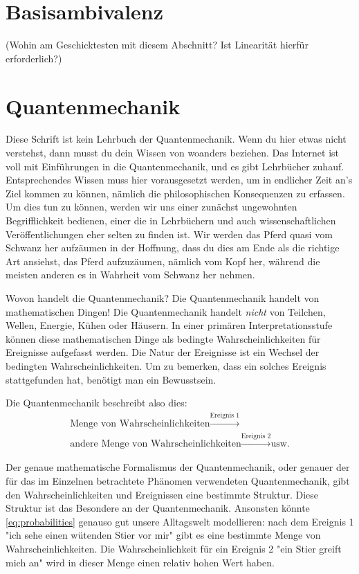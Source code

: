 \documentclass[12pt]{book}
\begin{document}
\section{Basisambivalenz}

(Wohin am Geschicktesten mit diesem Abschnitt? Ist Linearität hierfür erforderlich?)

\section{Quantenmechanik}

Diese Schrift ist kein Lehrbuch der Quantenmechanik. Wenn du hier etwas nicht verstehst, dann musst du dein Wissen von woanders beziehen. Das Internet ist voll mit Einführungen in die Quantenmechanik, und es gibt Lehrbücher zuhauf. Entsprechendes Wissen muss hier vorausgesetzt werden, um in endlicher Zeit an's Ziel kommen zu können, nämlich die philosophischen Konsequenzen zu erfassen. Um dies tun zu können, werden wir uns einer zunächst ungewohnten Begrifflichkeit bedienen, einer die in Lehrbüchern und auch wissenschaftlichen Veröffentlichungen eher selten zu finden ist. Wir werden das Pferd quasi vom Schwanz her aufzäumen in der Hoffnung, dass du dies am Ende als die richtige Art ansiehst, das Pferd aufzuzäumen, nämlich vom Kopf her, während die meisten anderen es in Wahrheit vom Schwanz her nehmen.

Wovon handelt die Quantenmechanik? Die Quantenmechanik handelt von mathematischen Dingen! Die Quantenmechanik handelt \emph{nicht} von Teilchen, Wellen, Energie, Kühen oder Häusern. In einer primären Interpretationsstufe können diese mathematischen Dinge als bedingte Wahrscheinlichkeiten für Ereignisse aufgefasst werden. Die Natur der Ereignisse ist ein Wechsel der bedingten Wahrscheinlichkeiten. Um zu bemerken, dass ein solches Ereignis stattgefunden hat, benötigt man ein Bewusstsein.

Die Quantenmechanik beschreibt also dies:
\begin{equation} \label{eq:probabilities}
\begin{split}
\textrm{Menge von Wahrscheinlichkeiten} \xrightarrow{\textrm{Ereignis 1}} \\
\textrm{andere Menge von Wahrscheinlichkeiten} \xrightarrow{\textrm{Ereignis 2}}  \textrm{usw.}
\end{split}
\end{equation}

Der genaue mathematische Formalismus der Quantenmechanik, oder genauer der für das im Einzelnen betrachtete Phänomen verwendeten Quantenmechanik, gibt den Wahrscheinlichkeiten und Ereignissen eine bestimmte Struktur. Diese Struktur ist das Besondere an der Quantenmechanik. Ansonsten könnte \ref{eq:probabilities} genauso gut unsere Alltagswelt modellieren: nach dem Ereignis 1 "ich sehe einen wütenden Stier vor mir" gibt es eine bestimmte Menge von Wahrscheinlichkeiten. Die Wahrscheinlichkeit für ein Ereignis 2 "ein Stier greift mich an" wird in dieser Menge einen relativ hohen Wert haben.
\end{document}
